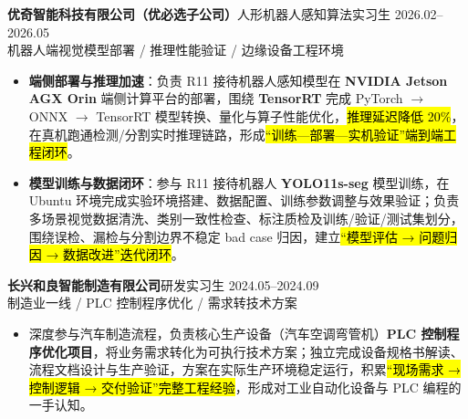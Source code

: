 \vspace{0.30em}
{\small\textbf{优奇智能科技有限公司（优必选子公司）}}\quad 人形机器人感知算法实习生 \hfill {2026.02--2026.05} \\
{\scriptsize\color{WHU_Blue} 机器人端视觉模型部署 / 推理性能验证 / 边缘设备工程环境}
\begin{itemize}
    \item \textbf{端侧部署与推理加速}：负责 R11 接待机器人感知模型在 \textbf{NVIDIA Jetson AGX Orin} 端侧计算平台的部署，围绕 \textbf{TensorRT} 完成 PyTorch $\rightarrow$ ONNX $\rightarrow$ TensorRT 模型转换、量化与算子性能优化，\hl{推理延迟降低 20\%}，在真机跑通检测/分割实时推理链路，形成\hl{“训练—部署—实机验证”端到端工程闭环}。
    \item \textbf{模型训练与数据闭环}：参与 R11 接待机器人 \textbf{YOLO11s-seg} 模型训练，在 Ubuntu 环境完成实验环境搭建、数据配置、训练参数调整与效果验证；负责多场景视觉数据清洗、类别一致性检查、标注质检及训练/验证/测试集划分，围绕误检、漏检与分割边界不稳定 bad case 归因，建立\hl{“模型评估 → 问题归因 → 数据改进”迭代闭环}。
\end{itemize}

\vspace{0.30em}
{\small\textbf{长兴和良智能制造有限公司}}\quad 研发实习生 \hfill {2024.05--2024.09} \\
{\scriptsize\color{WHU_Blue} 制造业一线 / PLC 控制程序优化 / 需求转技术方案}
\begin{itemize}
    \item 深度参与汽车制造流程，负责核心生产设备（汽车空调弯管机）\textbf{PLC 控制程序优化项目}，将业务需求转化为可执行技术方案；独立完成设备规格书解读、流程文档设计与生产验证，方案在实际生产环境稳定运行，积累\hl{“现场需求 → 控制逻辑 → 交付验证”完整工程经验}，形成对工业自动化设备与 PLC 编程的一手认知。
\end{itemize}

\vspace{0.04em}
